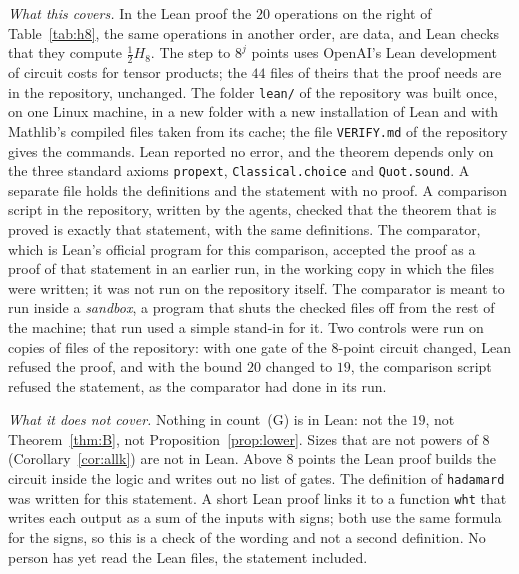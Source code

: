 \documentclass[10pt]{article}
\theoremstyle{remark}
\newcommand{\cntG}{\textup{(G)}}
\begin{document}
\emph{What this covers.} In the Lean proof the $20$ operations on the right of Table~\ref{tab:h8}, the same
operations in another order, are data, and Lean checks that they compute $\tfrac12H_8$. The step to $8^j$ points uses OpenAI's Lean development of circuit costs
for tensor products; the $44$ files of theirs that the proof needs are in the repository, unchanged. The
folder \verb|lean/| of the repository was built once, on one Linux machine, in a new folder with a new
installation of Lean and with Mathlib's compiled files taken from its cache; the file \verb|VERIFY.md| of
the repository gives the commands. Lean reported no error, and the theorem depends only on the three standard
axioms \verb|propext|, \verb|Classical.choice| and \verb|Quot.sound|. A separate file holds the definitions
and the statement with no proof. A comparison script in the repository, written by the agents, checked that
the theorem that is proved is exactly that statement, with the same definitions. The comparator, which is
Lean's official program for this comparison, accepted the proof as a proof of that statement in an earlier
run, in the working copy in which the files were written; it was not run on the repository itself. The
comparator is meant to run inside a \emph{sandbox}, a
program that shuts the checked files off from the rest of the machine; that run used a simple stand-in for
it. Two controls were run on copies of files of the repository: with one gate of the $8$-point circuit changed,
Lean refused the proof, and with the bound $20$ changed to $19$, the comparison script refused the statement,
as the comparator had done in its run.

\emph{What it does not cover.} Nothing in count~\cntG{} is in Lean: not the $19$, not Theorem~\ref{thm:B}, not
Proposition~\ref{prop:lower}. Sizes that are not powers of $8$ (Corollary~\ref{cor:allk}) are not in Lean.
Above $8$ points the Lean proof builds the circuit inside the logic and writes out no list of gates. The
definition of \verb|hadamard| was written for this statement. A short Lean proof links it to a function
\verb|wht| that writes each output as a sum of the inputs with signs; both use the same formula for the
signs, so this is a check of the wording and not a second definition. No person has yet read the Lean files,
the statement included.
\end{document}
